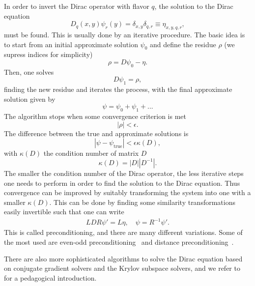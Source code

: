 In order to invert the Dirac operator with flavor $q$, the solution to the Dirac equation 
\begin{equation}
D_q(x,y)\psi_r(y)=\delta_{x,y}\delta_{q,r}\equiv\eta_{x,y,q,r},
\end{equation}
must be found. This is usually done by an iterative procedure. The basic idea is to start from an initial approximate solution $\psi_0$ and define the residue $\rho$ (we supress indices for simplicity)
\begin{equation}
\rho=D\psi_0-\eta.
\end{equation}
Then, one solves
\begin{equation}
D\psi_1=\rho,
\end{equation}
finding the new residue and iterates the process, with the final approximate solution given by
\begin{equation}
\psi=\psi_0+\psi_1+...
\end{equation}
The algorithm stops when some convergence criterion is met
\begin{equation}
|\rho|<\epsilon.
\end{equation}
The difference between the true and approximate solutions is
\begin{equation}
|\psi-\psi_{\textrm{true}}|<\epsilon\kappa(D),
\end{equation}
with $\kappa(D)$ the condition number of matrix $D$
\begin{equation}
\kappa(D)=|D||D^{-1}|.
\end{equation}
The smaller the condition number of the Dirac operator, the less iterative steps one needs to perform in order to find the solution to the Dirac equation. Thus convergence can be improved by suitably transforming the system into one with a smaller $\kappa(D)$. This can be done by finding some similarity transformations easily invertible such that one can write
\begin{gather}
LDR\psi'=L\eta, \quad \psi=R^{-1}\psi'.
\end{gather}
This is called preconditioning, and there are many different variations. Some of the most used are even-odd preconditioning~\citep{DEGRAND1988161} and distance preconditioning~\citep{deDivitiis:2010ya}.

There are also more sophisticated algorithms to solve the Dirac equation based on conjugate gradient solvers and the Krylov subspace solvers, and we refer to ~\cite{Gattringer_Lang_2010} for a pedagogical introduction.


